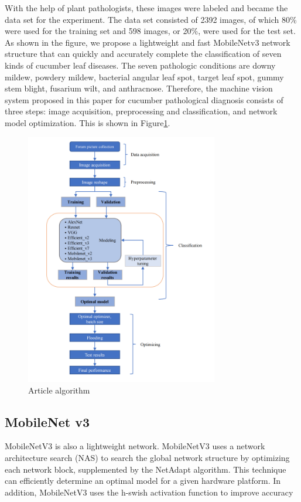 \documentclass[a4paper,fleqn]{cas-sc}
\begin{document}
With the help of plant pathologists, these images were labeled and became the data set for the experiment. The data set consisted of 2392 images, of which 80\% were used for the training set and 598 images, or 20\%, were used for the test set. As shown in the figure, we propose a lightweight and fast MobileNetv3 network structure that can quickly and accurately complete the classification of seven kinds of cucumber leaf diseases. The seven pathologic conditions are downy mildew, powdery mildew, bacterial angular leaf spot, target leaf spot, gummy stem blight, fusarium wilt, and anthracnose. Therefore, the machine vision system proposed in this paper for cucumber pathological diagnosis consists of three steps: image acquisition, preprocessing and classification, and network model optimization. This is shown in Figure\ref{fig:f2}.
\begin{figure}
\centering
\includegraphics[width=0.75\textwidth]{figs_rev1/f2.png}
\caption{Article algorithm}
\label{fig:f2}
\end{figure}

\subsection{MobileNet v3}
MobileNetV3 is also a lightweight network. MobileNetV3 uses a network architecture search (NAS) to search the global network structure by optimizing each network block, supplemented by the NetAdapt algorithm. This technique can efficiently determine an optimal model for a given hardware platform. In addition, MobileNetV3 uses the h-swish activation function to improve accuracy \cite{howard2019searching}
\end{document}
